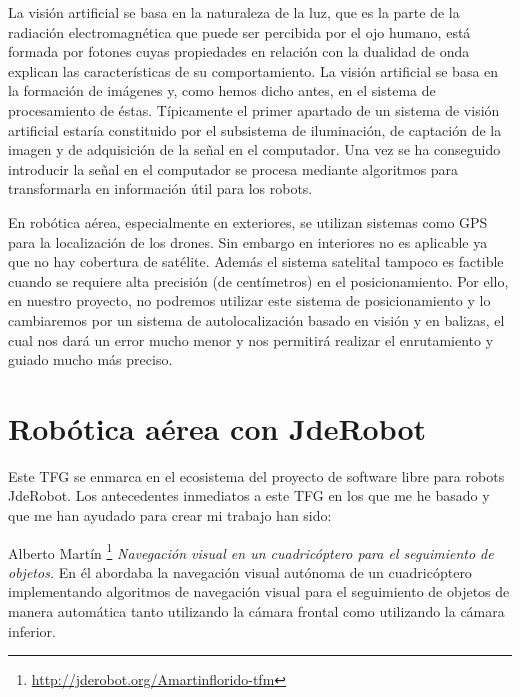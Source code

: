 \hspace{1cm} La visión artificial se basa en la naturaleza de la luz, que es la parte de la radiación electromagnética que puede ser percibida por el ojo humano, está formada por fotones cuyas propiedades en relación con la dualidad de onda explican las características de su comportamiento. La visión artificial se basa en la formación de imágenes y, como hemos dicho antes, en el sistema de procesamiento de éstas. Típicamente el primer apartado de un sistema de visión artificial estaría constituido  por  el  subsistema  de  iluminación,  de  captación  de  la  imagen  y  de adquisición  de  la  señal  en  el  computador. Una vez se ha conseguido introducir la señal en el computador se procesa mediante algoritmos para transformarla en información útil para los robots.

\hspace{1cm} En robótica aérea, especialmente en exteriores, se utilizan sistemas como GPS para la localización de los drones. Sin embargo en interiores no es aplicable ya que no hay cobertura de satélite. Además el sistema satelital tampoco es factible cuando se requiere alta precisión (de centímetros) en el posicionamiento. Por ello, en nuestro proyecto, no podremos utilizar este sistema de posicionamiento y lo cambiaremos por un sistema de autolocalización basado en visión y en balizas, el cual nos dará un error mucho menor y nos permitirá realizar el enrutamiento y guiado mucho más preciso.

\section{Robótica aérea con JdeRobot}
\hspace{1cm} Este TFG se enmarca en el ecosistema del proyecto de software libre para robots JdeRobot. Los antecedentes inmediatos a este TFG en los que me he basado y que me han ayudado para crear mi trabajo han sido:

\hspace{1cm} Alberto Martín \footnote{\url{http://jderobot.org/Amartinflorido-tfm}} \cite{AlbertoMartin} \textit{Navegación visual en un cuadricóptero para el seguimiento de objetos.} En él abordaba la navegación visual autónoma de un cuadricóptero implementando algoritmos de navegación visual para el seguimiento de objetos de manera automática tanto utilizando la cámara frontal como utilizando la cámara inferior.
\\

